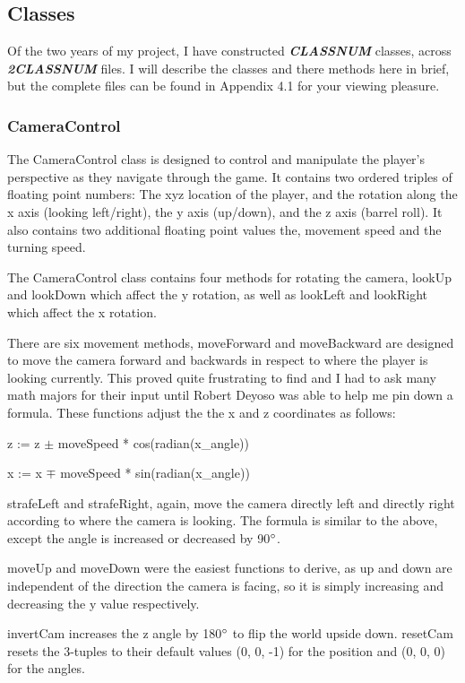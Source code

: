 \documentclass{article}
\begin{document}
\subsection{Classes}

Of the two years of my project, I have constructed \textbf{\textit{CLASSNUM}} classes, across \textbf{\textit{2CLASSNUM}} files. I will describe the classes and there methods here in brief, but the complete files can be found in Appendix 4.1 for your viewing pleasure.

\subsubsection{CameraControl}
The CameraControl class is designed to control and manipulate the player's perspective as they navigate through the game. It contains two ordered triples of floating point numbers: The xyz location of the player, and the rotation along the x axis (looking left/right), the y axis (up/down), and the z axis (barrel roll). It also contains two additional floating point values the, movement speed and the turning speed. 

The CameraControl class contains four methods for rotating the camera, lookUp and lookDown which affect the y rotation, as well as lookLeft and lookRight which affect the x rotation.

There are six movement methods, moveForward and moveBackward are designed to move the camera forward and backwards in respect to where the player is looking currently. This proved quite frustrating to find and I had to ask many math majors for their input until Robert Deyoso was able to help me pin down a formula. These functions adjust the the x and  z coordinates as follows:

z := z $\pm$ moveSpeed * cos(radian(x\_angle))

x := x $\mp$ moveSpeed * sin(radian(x\_angle))

strafeLeft and strafeRight, again, move the camera directly left and directly right according to where the camera is looking. The formula is similar to the above, except the angle is increased or decreased by 90$\degree$.

moveUp and moveDown were the easiest functions to derive, as up and down are independent of the direction the camera is facing, so it is simply increasing and decreasing the y value respectively. 

invertCam increases the z angle by 180$\degree$ to flip the world upside down.
resetCam resets the 3-tuples to their default values (0, 0, -1) for the position and (0, 0, 0) for the angles.
\end{document}
